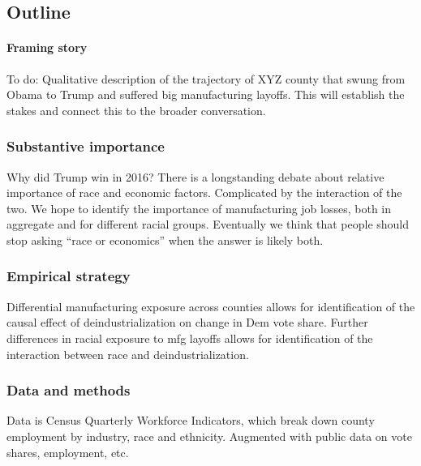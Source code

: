 \documentclass[
  12pt,
]{article}
\begin{document}
\hypertarget{outline}{%
\subsection{Outline}\label{outline}}

\hypertarget{framing-story}{%
\paragraph{Framing story}\label{framing-story}}

To do: Qualitative description of the trajectory of XYZ county that
swung from Obama to Trump and suffered big manufacturing layoffs. This
will establish the stakes and connect this to the broader conversation.

\hypertarget{substantive-importance}{%
\subsubsection{Substantive importance}\label{substantive-importance}}

Why did Trump win in 2016? There is a longstanding debate about relative
importance of race and economic factors. Complicated by the interaction
of the two. We hope to identify the importance of manufacturing job
losses, both in aggregate and for different racial groups. Eventually we
think that people should stop asking ``race or economics'' when the
answer is likely both.

\hypertarget{empirical-strategy}{%
\subsubsection{Empirical strategy}\label{empirical-strategy}}

Differential manufacturing exposure across counties allows for
identification of the causal effect of deindustrialization on change in
Dem vote share. Further differences in racial exposure to mfg layoffs
allows for identification of the interaction between race and
deindustrialization.

\hypertarget{data-and-methods}{%
\subsubsection{Data and methods}\label{data-and-methods}}

Data is Census Quarterly Workforce Indicators, which break down county
employment by industry, race and ethnicity. Augmented with public data
on vote shares, employment, etc.
\end{document}
